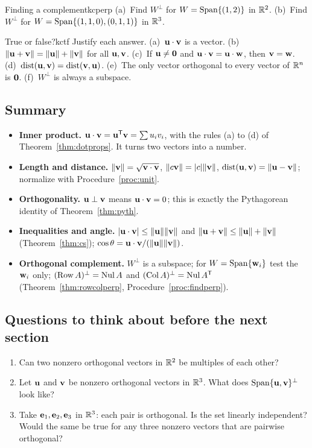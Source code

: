 \documentclass[11pt]{article}
\begin{document}
\begin{kc}{Finding a complement}{kcperp}
(a)~Find $W^{\perp}$ for $W=\operatorname{Span}\{(1,2)\}$ in $\mathbb{R}^2$. (b)~Find $W^{\perp}$ for $W=\operatorname{Span}\{(1,1,0),(0,1,1)\}$ in $\mathbb{R}^3$.
\end{kc}

\begin{kc}{True or false?}{kctf}
Justify each answer. (a)~$\mathbf{u}\cdot\mathbf{v}$ is a vector. (b)~$\lVert\mathbf{u}+\mathbf{v}\rVert=\lVert\mathbf{u}\rVert+\lVert\mathbf{v}\rVert$ for all $\mathbf{u},\mathbf{v}$. (c)~If $\mathbf{u}\neq\mathbf{0}$ and $\mathbf{u}\cdot\mathbf{v}=\mathbf{u}\cdot\mathbf{w}$, then $\mathbf{v}=\mathbf{w}$. (d)~$\operatorname{dist}(\mathbf{u},\mathbf{v})=\operatorname{dist}(\mathbf{v},\mathbf{u})$. (e)~The only vector orthogonal to every vector of $\mathbb{R}^n$ is $\mathbf{0}$. (f)~$W^{\perp}$ is always a subspace.
\end{kc}

\subsection*{Summary}
\begin{itemize}
  \item \textbf{Inner product.} $\mathbf{u}\cdot\mathbf{v}=\mathbf{u}^{\mathsf T}\mathbf{v}=\sum u_iv_i$, with the rules (a) to (d) of Theorem~\ref{thm:dotprops}. It turns two vectors into a number.
  \item \textbf{Length and distance.} $\lVert\mathbf{v}\rVert=\sqrt{\mathbf{v}\cdot\mathbf{v}}$, $\lVert c\mathbf{v}\rVert=|c|\lVert\mathbf{v}\rVert$, $\operatorname{dist}(\mathbf{u},\mathbf{v})=\lVert\mathbf{u}-\mathbf{v}\rVert$; normalize with Procedure~\ref{proc:unit}.
  \item \textbf{Orthogonality.} $\mathbf{u}\perp\mathbf{v}$ means $\mathbf{u}\cdot\mathbf{v}=0$; this is exactly the Pythagorean identity of Theorem~\ref{thm:pyth}.
  \item \textbf{Inequalities and angle.} $|\mathbf{u}\cdot\mathbf{v}|\le\lVert\mathbf{u}\rVert\lVert\mathbf{v}\rVert$ and $\lVert\mathbf{u}+\mathbf{v}\rVert\le\lVert\mathbf{u}\rVert+\lVert\mathbf{v}\rVert$ (Theorem~\ref{thm:cs}); $\cos\theta=\mathbf{u}\cdot\mathbf{v}/(\lVert\mathbf{u}\rVert\lVert\mathbf{v}\rVert)$.
  \item \textbf{Orthogonal complement.} $W^{\perp}$ is a subspace; for $W=\operatorname{Span}\{\mathbf{w}_i\}$ test the $\mathbf{w}_i$ only; $(\operatorname{Row} A)^{\perp}=\operatorname{Nul} A$ and $(\operatorname{Col} A)^{\perp}=\operatorname{Nul} A^{\mathsf T}$ (Theorem~\ref{thm:rowcolperp}, Procedure~\ref{proc:findperp}).
\end{itemize}

\subsection*{Questions to think about before the next section}
\begin{enumerate}[nosep]
  \item Can two nonzero orthogonal vectors in $\mathbb{R}^2$ be multiples of each other?
  \item Let $\mathbf{u}$ and $\mathbf{v}$ be nonzero orthogonal vectors in $\mathbb{R}^3$. What does $\operatorname{Span}\{\mathbf{u},\mathbf{v}\}^{\perp}$ look like?
  \item Take $\mathbf{e}_1,\mathbf{e}_2,\mathbf{e}_3$ in $\mathbb{R}^3$: each pair is orthogonal. Is the set linearly independent? Would the same be true for any three nonzero vectors that are pairwise orthogonal?
\end{enumerate}
\end{document}
